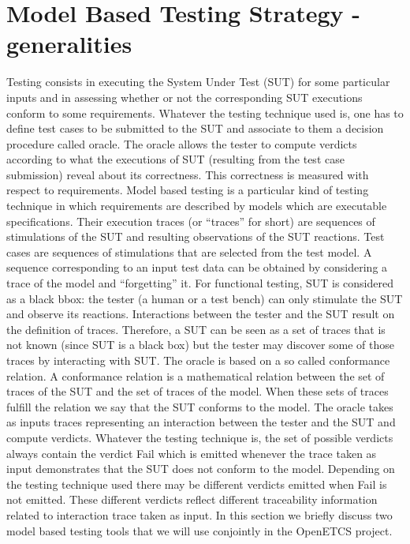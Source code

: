 \section{Model Based Testing Strategy - generalities}
Testing consists in executing the System Under Test (SUT) for some
particular inputs and in assessing whether or not the corresponding
SUT executions conform to some requirements.  Whatever the testing
technique used is, one has to define test cases to be submitted to the
SUT and associate to them a decision procedure called oracle. The
oracle allows the tester to compute verdicts according to what the
executions of SUT (resulting from the test case submission) reveal
about its correctness.  This correctness is measured with respect to
requirements. Model based testing is a particular kind of testing
technique in which requirements are described by models which are
executable specifications. Their execution traces (or ``traces'' for
short) are sequences of stimulations of the SUT and resulting
observations of the SUT reactions. Test cases are sequences of
stimulations that are selected from the test model. A sequence
corresponding to an input test data can be obtained by considering a
trace of the model and ``forgetting'' it. For functional testing, SUT
is considered as a black bbox: the tester (a human or a test bench)
can only stimulate the SUT and observe its reactions. Interactions
between the tester and the SUT result on the definition of
traces. Therefore, a SUT can be seen as a set of traces that is not
known (since SUT is a black box) but the tester may discover some of
those traces by interacting with SUT. The oracle is based on a so
called conformance relation. A conformance relation is a mathematical
relation between the set of traces of the SUT and the set of traces of
the model.  When these sets of traces fulfill the relation we say that
the SUT conforms to the model. The oracle takes as inputs traces
representing an interaction between the tester and the SUT and compute
verdicts. Whatever the testing technique is, the set of possible
verdicts always contain the verdict Fail which is emitted whenever the
trace taken as input demonstrates that the SUT does not conform to the
model. Depending on the testing technique used there may be different
verdicts emitted when Fail is not emitted. These different verdicts
reflect different traceability information related to interaction
trace taken as input. In this section we briefly discuss two model
based testing tools that we will use conjointly in the OpenETCS
project.


